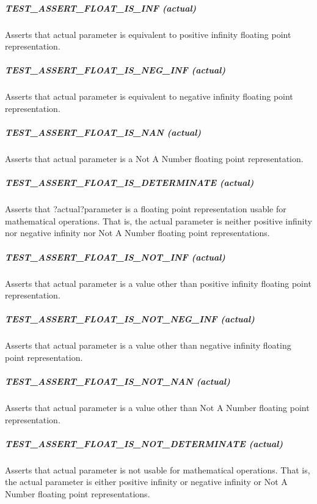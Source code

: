 \subparagraph*{{\ttfamily T\+E\+S\+T\+\_\+\+A\+S\+S\+E\+R\+T\+\_\+\+F\+L\+O\+A\+T\+\_\+\+I\+S\+\_\+\+I\+NF (actual)}}

Asserts that {\ttfamily actual} parameter is equivalent to positive infinity floating point representation.

\subparagraph*{{\ttfamily T\+E\+S\+T\+\_\+\+A\+S\+S\+E\+R\+T\+\_\+\+F\+L\+O\+A\+T\+\_\+\+I\+S\+\_\+\+N\+E\+G\+\_\+\+I\+NF (actual)}}

Asserts that {\ttfamily actual} parameter is equivalent to negative infinity floating point representation.

\subparagraph*{{\ttfamily T\+E\+S\+T\+\_\+\+A\+S\+S\+E\+R\+T\+\_\+\+F\+L\+O\+A\+T\+\_\+\+I\+S\+\_\+\+N\+AN (actual)}}

Asserts that {\ttfamily actual} parameter is a Not A Number floating point representation.

\subparagraph*{{\ttfamily T\+E\+S\+T\+\_\+\+A\+S\+S\+E\+R\+T\+\_\+\+F\+L\+O\+A\+T\+\_\+\+I\+S\+\_\+\+D\+E\+T\+E\+R\+M\+I\+N\+A\+TE (actual)}}

Asserts that ?actual?parameter is a floating point representation usable for mathematical operations. That is, the {\ttfamily actual} parameter is neither positive infinity nor negative infinity nor Not A Number floating point representations.

\subparagraph*{{\ttfamily T\+E\+S\+T\+\_\+\+A\+S\+S\+E\+R\+T\+\_\+\+F\+L\+O\+A\+T\+\_\+\+I\+S\+\_\+\+N\+O\+T\+\_\+\+I\+NF (actual)}}

Asserts that {\ttfamily actual} parameter is a value other than positive infinity floating point representation.

\subparagraph*{{\ttfamily T\+E\+S\+T\+\_\+\+A\+S\+S\+E\+R\+T\+\_\+\+F\+L\+O\+A\+T\+\_\+\+I\+S\+\_\+\+N\+O\+T\+\_\+\+N\+E\+G\+\_\+\+I\+NF (actual)}}

Asserts that {\ttfamily actual} parameter is a value other than negative infinity floating point representation.

\subparagraph*{{\ttfamily T\+E\+S\+T\+\_\+\+A\+S\+S\+E\+R\+T\+\_\+\+F\+L\+O\+A\+T\+\_\+\+I\+S\+\_\+\+N\+O\+T\+\_\+\+N\+AN (actual)}}

Asserts that {\ttfamily actual} parameter is a value other than Not A Number floating point representation.

\subparagraph*{{\ttfamily T\+E\+S\+T\+\_\+\+A\+S\+S\+E\+R\+T\+\_\+\+F\+L\+O\+A\+T\+\_\+\+I\+S\+\_\+\+N\+O\+T\+\_\+\+D\+E\+T\+E\+R\+M\+I\+N\+A\+TE (actual)}}

Asserts that {\ttfamily actual} parameter is not usable for mathematical operations. That is, the {\ttfamily actual} parameter is either positive infinity or negative infinity or Not A Number floating point representations.


